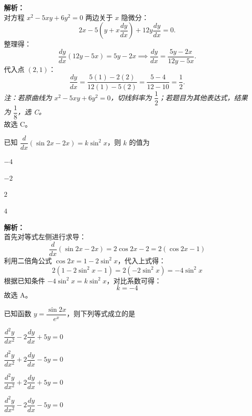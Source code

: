 \documentclass[12pt,a4paper]{exam-zh}
\begin{document}
\begin{solution}
    \textbf{解析：} \\
    对方程 $x^2 - 5xy + 6y^2 = 0$ 两边关于 $x$ 隐微分：
    \[
        2x - 5\!\left(y + x\frac{dy}{dx}\right) + 12y\frac{dy}{dx} = 0.
    \]
    整理得：
    \[
        \frac{dy}{dx}(12y - 5x) = 5y - 2x
        \implies \frac{dy}{dx} = \frac{5y - 2x}{12y - 5x}.
    \]
    代入点 $(2, 1)$：
    \[
        \frac{dy}{dx} = \frac{5(1) - 2(2)}{12(1) - 5(2)} = \frac{5 - 4}{12 - 10} = \frac{1}{2}.
    \]
    \textit{注：若原曲线为 $x^2 - 5xy + 6y^2 = 0$，切线斜率为 $\dfrac{1}{2}$；若题目为其他表达式，结果为 $\dfrac{1}{8}$，选 C。} \\
    故选 C。
\end{solution}

\begin{question}
    已知 $\dfrac{d}{dx}(\sin 2x - 2x) = k \sin^2 x$，则 $k$ 的值为 \paren[A]
    \begin{choices}
        \item $-4$ 
        \item $-2$ 
        \item $2$ 
        \item $4$
    \end{choices}
\end{question}

\begin{solution}
    \textbf{解析：} \\
    首先对等式左侧进行求导：
    \[
        \dfrac{d}{dx}(\sin 2x - 2x) = 2\cos 2x - 2 = 2(\cos 2x - 1)
    \]
    利用二倍角公式 $\cos 2x = 1 - 2\sin^2 x$，代入上式得：
    \[
        2(1 - 2\sin^2 x - 1) = 2(-2\sin^2 x) = -4\sin^2 x
    \]
    根据已知条件 $-4\sin^2 x = k \sin^2 x$，对比系数可得：
    \[
        k = -4
    \]
    故选 A。
\end{solution}
\begin{question}
    已知函数 $y = \dfrac{\sin 2x}{e^x}$，则下列等式成立的是 \paren[C]
    \begin{choices}
        \item $\dfrac{d^2y}{dx^2} - 2\dfrac{dy}{dx} + 5y = 0$ 
        \item $\dfrac{d^2y}{dx^2} + 2\dfrac{dy}{dx} - 5y = 0$ 
        \item $\dfrac{d^2y}{dx^2} + 2\dfrac{dy}{dx} + 5y = 0$ 
        \item $\dfrac{d^2y}{dx^2} - 2\dfrac{dy}{dx} - 5y = 0$
    \end{choices}
\end{question}
\end{document}

